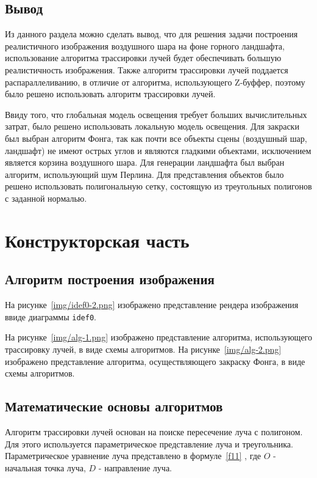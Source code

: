 
\section{Вывод}
Из данного раздела можно сделать вывод, что для решения задачи построения реалистичного изображения воздушного шара на фоне горного ландшафта, использование алгоритма трассировки лучей будет обеспечивать большую реалистичность изображения. Также алгоритм трассировки лучей поддается распараллеливанию, в отличие от алгоритма, использующего Z-буффер, поэтому было решено использовать алгоритм трассировки лучей. 

Ввиду того, что глобальная модель освещения требует больших вычислительных затрат, было решено использовать локальную модель освещения. Для закраски был выбран алгоритм Фонга, так как почти все объекты сцены (воздушный шар, ландшафт) не имеют острых углов и являются гладкими объектами, исключением является корзина воздушного шара. Для генерации ландшафта был выбран алгоритм, использующий шум Перлина. Для представления объектов было решено использовать полигональную сетку, состоящую из треугольных полигонов с заданной нормалью.

\chapter{Конструкторская часть}
\section{Алгоритм построения изображения}
На рисунке~\ref{img/idef0-2.png} изображено представление рендера изображения ввиде диаграммы \texttt{idef0}.

На рисунке~\ref{img/alg-1.png} изображено представление алгоритма, использующего трассировку лучей, в виде схемы алгоритмов. На рисунке~\ref{img/alg-2.png} изображено представление алгоритма, осуществляющего закраску Фонга, в виде схемы алгоритмов.



\section{Математические основы алгоритмов}
Алгоритм трассировки лучей основан на поиске пересечение луча с полигоном. Для этого используется параметрическое представление луча и треугольника.
Параметрическое уравнение луча представлено в формуле~\ref{f11} \cite{sherley}, где $O$ - начальная точка луча, $D$ - направление луча.

